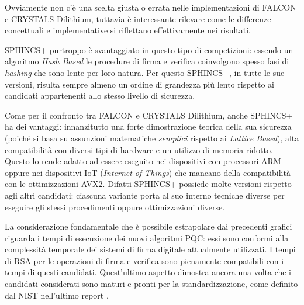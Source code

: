 Ovviamente non c'è una scelta giusta o errata nelle implementazioni di FALCON e CRYSTALS Dilithium, tuttavia è interessante rilevare come le differenze concettuali e implementative si riflettano effettivamente nei risultati.

SPHINCS+ purtroppo è svantaggiato in questo tipo di competizioni: essendo un algoritmo \textit{Hash Based} le procedure di firma e verifica coinvolgono spesso fasi di \textit{hashing} che sono lente per loro natura. Per questo SPHINCS+, in tutte le sue versioni, risulta sempre almeno un ordine di grandezza più lento rispetto ai candidati appartenenti allo stesso livello di sicurezza.

Come per il confronto tra FALCON e CRYSTALS Dilithium, anche SPHINCS+ ha dei vantaggi: innanzitutto una forte dimostrazione teorica della sua sicurezza (poiché si basa su assunzioni matematiche \textit{semplici} rispetto ai \textit{Lattice Based}), alta compatibilità con diversi tipi di hardware e un utilizzo di memoria ridotto. Questo lo rende adatto ad essere eseguito nei dispositivi con processori ARM oppure nei dispositivi IoT (\textit{Internet of Things}) che mancano della compatibilità con le ottimizzazioni AVX2. Difatti SPHINCS+ possiede molte versioni rispetto agli altri candidati: ciascuna variante porta al suo interno tecniche diverse per eseguire gli stessi procedimenti oppure ottimizzazioni diverse.

La considerazione fondamentale che è possibile estrapolare dai precedenti grafici riguarda i tempi di esecuzione dei nuovi algoritmi PQC: essi sono conformi alla complessità temporale dei sistemi di firma digitale attualmente utilizzati. I tempi di RSA per le operazioni di firma e verifica sono pienamente compatibili con i tempi di questi candidati. Quest'ultimo aspetto dimostra ancora una volta che i candidati considerati sono maturi e pronti per la standardizzazione, come definito dal NIST nell'ultimo report \cite{NISTthirdReport}.